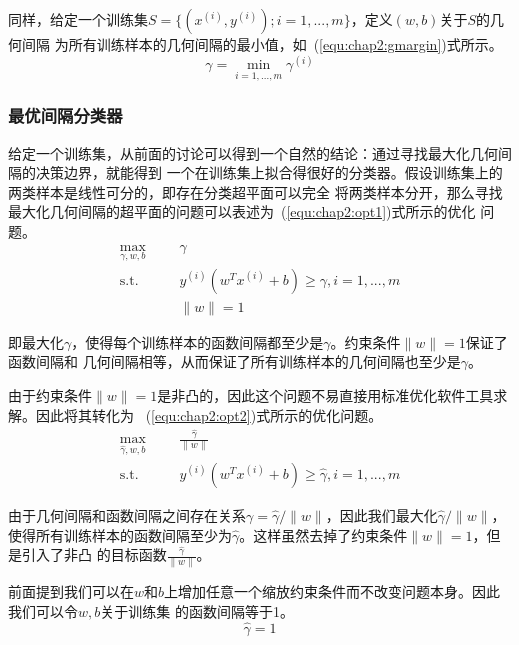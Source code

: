 同样，给定一个训练集$S=\{(x^{(i)},y^{(i)});i=1,...,m\}$，定义$(w,b)$关于$S$的几何间隔
为所有训练样本的几何间隔的最小值，如~(\ref{equ:chap2:gmargin})式所示。
\begin{equation}
  \label{equ:chap2:gmargin}
  \gamma=\min_{i=1,...,m}\gamma^{(i)}
\end{equation}

\subsubsection{最优间隔分类器}

给定一个训练集，从前面的讨论可以得到一个自然的结论：通过寻找最大化几何间隔的决策边界，就能得到
一个在训练集上拟合得很好的分类器。假设训练集上的两类样本是线性可分的，即存在分类超平面可以完全
将两类样本分开，那么寻找最大化几何间隔的超平面的问题可以表述为~(\ref{equ:chap2:opt1})式所示的优化
问题。
\begin{equation}
  \label{equ:chap2:opt1}
  \begin{aligned}
    \max_{\gamma,w,b} &
    & & \gamma \\
    \text{s.t.} &
    & & y^{(i)}\left(w^Tx^{(i)}+b\right)\geq \gamma, i=1,...,m \\
    \quad &
    & & \|w\|=1
  \end{aligned}
\end{equation}

即最大化$\gamma$，使得每个训练样本的函数间隔都至少是$\gamma$。约束条件$\|w\|=1$保证了函数间隔和
几何间隔相等，从而保证了所有训练样本的几何间隔也至少是$\gamma$。

由于约束条件$\|w\|=1$是非凸的，因此这个问题不易直接用标准优化软件工具求解。因此将其转化为
~(\ref{equ:chap2:opt2})式所示的优化问题。
\begin{equation}
  \label{equ:chap2:opt2}
  \begin{aligned}
    \max_{\hat{\gamma},w,b} &
    & & \frac{\hat{\gamma}}{\|w\|} \\
    \text{s.t.} &
    & & y^{(i)}\left(w^Tx^{(i)}+b\right)\geq \hat{\gamma}, i=1,...,m
  \end{aligned}
\end{equation}

由于几何间隔和函数间隔之间存在关系$\gamma=\hat{\gamma}/\|w\|$，因此我们最大化$\hat{\gamma}/\|w\|$，
使得所有训练样本的函数间隔至少为$\hat{\gamma}$。这样虽然去掉了约束条件$\|w\|=1$，但是引入了非凸
的目标函数$\frac{\hat{\gamma}}{\|w\|}$。

前面提到我们可以在$w$和$b$上增加任意一个缩放约束条件而不改变问题本身。因此我们可以令$w,b$关于训练集
的函数间隔等于1。
\begin{equation}
  \label{equ:chap2:constrain}
  \hat{\gamma} = 1
\end{equation}

